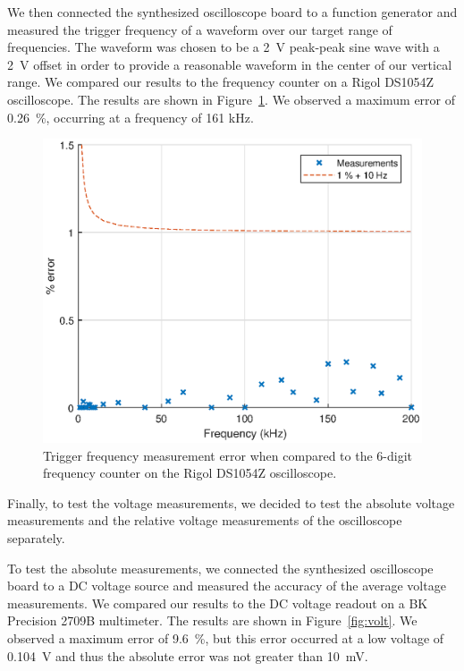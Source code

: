 \documentclass[journal]{IEEEtran}
\begin{document}
We then connected the synthesized oscilloscope board to a function generator and measured the trigger frequency of a waveform over our target range of frequencies. The waveform was chosen to be a 2~V peak-peak sine wave with a 2~V offset in order to provide a reasonable waveform in the center of our vertical range. We compared our results to the frequency counter on a Rigol DS1054Z oscilloscope. The results are shown in Figure~\ref{fig:freq}. We observed a maximum error of 0.26~\%, occurring at a frequency of 161 kHz.

\begin{figure}[!htb]
  \centering
  \includegraphics[width=\columnwidth]{test-results/freq.eps}
  \caption{Trigger frequency measurement error when compared to the 6-digit frequency counter on the Rigol DS1054Z oscilloscope.}
  \label{fig:freq}
\end{figure}

Finally, to test the voltage measurements, we decided to test the absolute voltage measurements and the relative voltage measurements of the oscilloscope separately.

To test the absolute measurements, we connected the synthesized oscilloscope board to a DC voltage source and measured the accuracy of the average voltage measurements. We compared our results to the DC voltage readout on a BK Precision 2709B multimeter. The results are shown in Figure~\ref{fig:volt}. We observed a maximum error of 9.6~\%, but this error occurred at a low voltage of 0.104~V and thus the absolute error was not greater than 10~mV.
\end{document}
